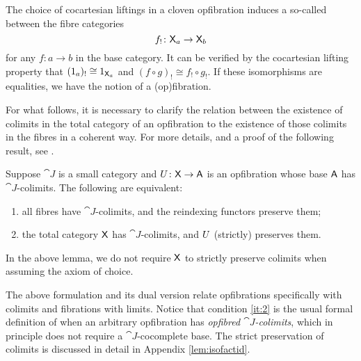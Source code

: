 \documentclass{amsart}
\begin{document}
%
%
The choice of cocartesian liftings in a cloven opfibration induces a so-called  between the fibre categories
\begin{equation}\label{reindexing}
 f_!\colon\mathsf{X}_a\to\mathsf{X}_b
\end{equation}
for any $f\colon a\to b$ in the base category. It can be verified by the cocartesian lifting property that $(1_a)_!\cong1_{\mathsf{X}_a}$ and $(f\circ g)_!\cong f_!\circ g_!$. If these isomorphisms are equalities, we have the notion of a  (op)fibration.

For what follows, it is necessary to clarify the relation between the existence of colimits in the total category of an opfibration to the existence of those colimits in the fibres in a coherent way. For more details, and a proof of the following result, see \cite[Cor. 3.7]{FibredAdjunctions}.

\begin{lem}\label{lem:fibrewiselimits}
  Suppose $\cat{J}$ is a small category and $U\colon\mathsf{X}\to\mathsf{A}$ is an
  opfibration whose base $\mathsf{A}$ has $\cat{J}$-colimits. The following
  are equivalent:
\begin{enumerate}
 \item all fibres have $\cat{J}$-colimits, and the reindexing functors preserve them; \label{it:2}
 \item the total category $\mathsf{X}$ has $\cat{J}$-colimits, and $U$ (strictly) preserves them.
\end{enumerate}
\end{lem}

\begin{remark}
  In the above lemma, we do not require $\mathsf{X}$ to strictly preserve colimits when assuming the axiom of choice. 
\end{remark}

The above formulation and its dual version relate opfibrations specifically with colimits and fibrations with limits. Notice that condition \ref{it:2} is the usual formal definition of when an arbitrary opfibration has \emph{opfibred $\cat{J}$-colimits}, which in principle does not require a $\cat{J}$-cocomplete base. The strict preservation of colimits is discussed in detail in Appendix \ref{lem:isofactid}.
\end{document}
